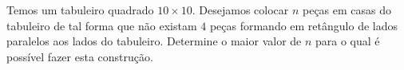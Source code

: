 Temos um tabuleiro quadrado $10 \times 10$.
Desejamos colocar $n$ peças em casas do tabuleiro de tal forma que não existam $4$ peças formando em retângulo de lados paralelos aos lados do tabuleiro.
Determine o maior valor de $n$ para o qual é possível fazer esta construção.